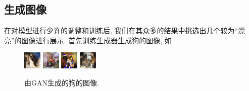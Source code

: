 \documentclass[lang=cn,11pt]{elegantpaper}
\begin{document}
\subsection{生成图像}
在对模型进行少许的调整和训练后, 我们在其众多的结果中挑选出几个较为“漂亮”的图像进行展示. 首先训练生成器生成狗的图像, 如 
\begin{figure}[htbp]
  \centering
  \includegraphics[width=.2\textwidth]{dog1}
  \includegraphics[width=.2\textwidth]{dog2}
  \includegraphics[width=.2\textwidth]{dog3}
  \includegraphics[width=.2\textwidth]{dog4}
  \caption{由GAN生成的狗的图像. \label{fig:dog}}
\end{figure}
\end{document}
